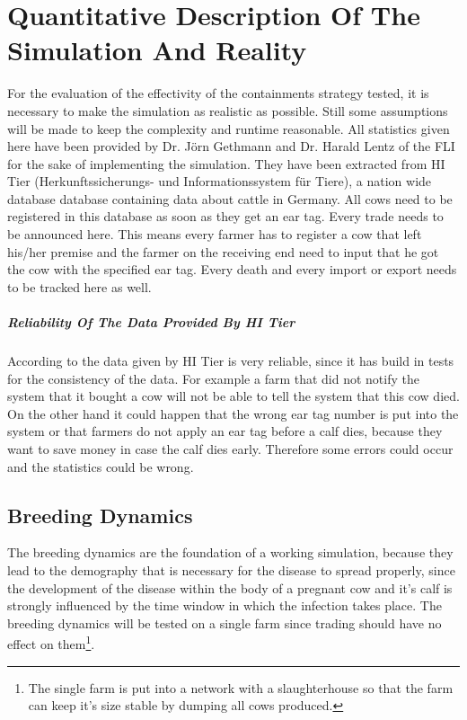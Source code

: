 \chapter{Quantitative Description Of The Simulation And Reality}
For the evaluation of the effectivity of the containments strategy tested, it is necessary to make the simulation as realistic as possible. Still some assumptions will be made to keep the complexity and runtime reasonable. 
All statistics given here have been provided by Dr. Jörn Gethmann and Dr. Harald Lentz of the FLI for the sake of implementing the simulation. They have been extracted from HI Tier (Herkunftssicherungs- und Informationssystem für Tiere), a nation wide database database containing data about cattle in Germany. All cows need to be registered in this database as soon as they get an ear tag. Every trade needs to be announced here. This means every farmer has to register a cow that left his/her premise and the farmer on the receiving end need to input that he got the cow with the specified ear tag. Every death and every import or export needs to be tracked here as well.
\paragraph{Reliability Of The Data Provided By HI Tier}
According to \citep{personalCom} the data given by HI Tier is very reliable, since it has build in tests for the consistency of the data. For example a farm that did not notify the system that it bought a cow will not be able to tell the system that this cow died. On the other hand it could happen that the wrong ear tag number is put into the system or that farmers do not apply an ear tag before a calf dies, because they want to save money in case the calf dies early. Therefore some errors could occur and the statistics could be wrong.
\section{Breeding Dynamics}\label{chap:breedingDynamics}
The breeding dynamics are the foundation of a working simulation, because they lead to the demography that is necessary for the disease to spread properly, since the development of the disease within the body of a pregnant cow and it's calf is strongly influenced by the time window in which the infection takes place.
The breeding dynamics will be tested on a single farm since trading should have no effect on them\footnote{The single farm is put into a network with a slaughterhouse so that the farm can keep it's size stable by dumping all cows produced.}.
